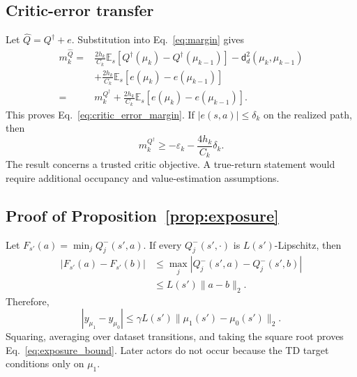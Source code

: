 \subsection{Critic-error transfer}
Let $\widehat Q=Q^\dagger+e$. Substitution into Eq.~\eqref{eq:margin} gives
\begin{equation}
\begin{split}
m_k^{\widehat Q}
={}&\frac{2h_k}{C_k}\mathbb E_s
 [Q^\dagger(\mu_k)-Q^\dagger(\mu_{k-1})]
 -\mathsf d_d^2(\mu_k,\mu_{k-1})\\
&+\frac{2h_k}{C_k}\mathbb E_s[e(\mu_k)-e(\mu_{k-1})]\\
={}&m_k^{Q^\dagger}
+\frac{2h_k}{C_k}\mathbb E_s[e(\mu_k)-e(\mu_{k-1})].
\end{split}
\end{equation}
This proves Eq.~\eqref{eq:critic_error_margin}. If
$|e(s,a)|\leq\delta_k$ on the realized path, then
\begin{equation}
m_k^{Q^\dagger}\geq-\varepsilon_k-\frac{4h_k}{C_k}\delta_k.
\end{equation}
The result concerns a trusted critic objective. A true-return statement would
require additional occupancy and value-estimation assumptions.

\subsection{Proof of Proposition~\ref{prop:exposure}}
Let $F_{s'}(a)=\min_jQ_j^-(s',a)$. If every
$Q_j^-(s',\cdot)$ is $L(s')$-Lipschitz, then
\begin{equation}
\begin{split}
|F_{s'}(a)-F_{s'}(b)|
&\leq\max_j|Q_j^-(s',a)-Q_j^-(s',b)|\\
&\leq L(s')\|a-b\|_2.
\end{split}
\end{equation}
Therefore,
\begin{equation}
|y_{\mu_1}-y_{\mu_0}|
\leq\gamma L(s')\|\mu_1(s')-\mu_0(s')\|_2.
\end{equation}
Squaring, averaging over dataset transitions, and taking the square root proves
Eq.~\eqref{eq:exposure_bound}. Later actors do not occur because the TD target
conditions only on $\mu_1$.

